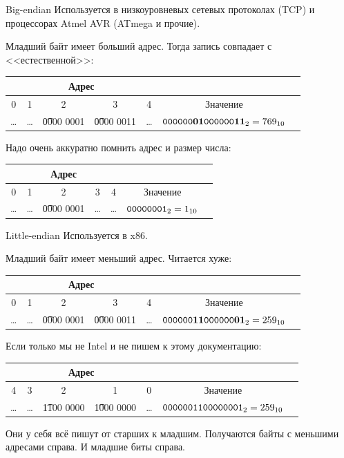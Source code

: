 \begin{frame}{Big-endian}
	Используется в низкоуровневых сетевых протоколах (TCP) и процессорах Atmel AVR (ATmega и прочие).

	Младший байт имеет больший адрес.
	Тогда запись совпадает с <<естественной>>:
	\begin{center}
		\begin{tabular}{|c|c|c|c|c|c|c|}
			\hline
			\multicolumn{5}{|c|}{Адрес} & \\\hline
			0 & 1 & 2 & 3 & 4 & Значение \\\hline
			\dots & \dots & \t{0000 0001} & \t{0000 0011} & \dots & $\t{0000 00\textbf{01} 0000 00\textbf{11}}_2=769_{10}$ \\\hline
		\end{tabular}
	\end{center}

	Надо очень аккуратно помнить адрес и размер числа:
	\begin{center}
		\begin{tabular}{|c|c|c|c|c|c|c|}
			\hline
			\multicolumn{5}{|c|}{Адрес} & \\\hline
			0 & 1 & 2 & 3 & 4 & Значение \\\hline
			\dots & \dots & \t{0000 0001} & \dots & \dots & $\t{0000 0001}_2=1_{10}$ \\\hline
		\end{tabular}
	\end{center}
\end{frame}

\begin{frame}{Little-endian}
	Используется в x86.

	Младший байт имеет меньший адрес.
	Читается хуже:
	\begin{center}
		\begin{tabular}{|c|c|c|c|c|c|c|}
			\hline
			\multicolumn{5}{|c|}{Адрес} & \\\hline
			0 & 1 & 2 & 3 & 4 & Значение \\\hline
			\dots & \dots & \t{0000 0001} & \t{0000 0011} & \dots & $\t{0000 00\textbf{11} 0000 00\textbf{01}}_2=259_{10}$ \\\hline
		\end{tabular}
	\end{center}
	Если только мы не Intel и не пишем к этому документацию:
	\begin{center}
		\begin{tabular}{|c|c|c|c|c|c|c|}
			\hline
			\multicolumn{5}{|c|}{Адрес} & \\\hline
			4 & 3 & 2 & 1 & 0 & Значение \\\hline
			\dots & \dots & \t{1100 0000} & \t{1000 0000} & \dots & $\t{0000 0011 0000 0001}_2=259_{10}$ \\\hline
		\end{tabular}
	\end{center}
	Они у себя всё пишут от старших к младшим.
	Получаются байты с меньшими адресами справа.
	И младшие биты справа.
\end{frame}

